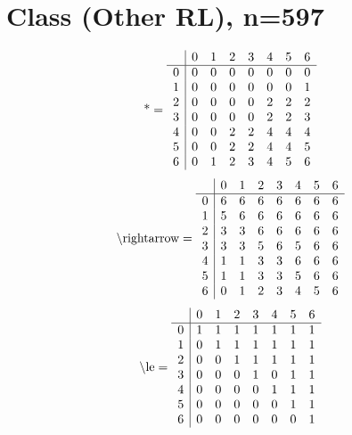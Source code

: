 \documentclass[11pt]{article}
\begin{document}
\section{Class (Other RL), n=597}
\[\text{*} = 
\begin{array}{r | r r r r r r r}
 & 0 & 1 & 2 & 3 & 4 & 5 & 6 \\ \hline
0 & 0 & 0 & 0 & 0 & 0 & 0 & 0 \\
1 & 0 & 0 & 0 & 0 & 0 & 0 & 1 \\
2 & 0 & 0 & 0 & 0 & 2 & 2 & 2 \\
3 & 0 & 0 & 0 & 0 & 2 & 2 & 3 \\
4 & 0 & 0 & 2 & 2 & 4 & 4 & 4 \\
5 & 0 & 0 & 2 & 2 & 4 & 4 & 5 \\
6 & 0 & 1 & 2 & 3 & 4 & 5 & 6 \\
\end{array}
\]
\[\text{\textbackslash rightarrow} = 
\begin{array}{r | r r r r r r r}
 & 0 & 1 & 2 & 3 & 4 & 5 & 6 \\ \hline
0 & 6 & 6 & 6 & 6 & 6 & 6 & 6 \\
1 & 5 & 6 & 6 & 6 & 6 & 6 & 6 \\
2 & 3 & 3 & 6 & 6 & 6 & 6 & 6 \\
3 & 3 & 3 & 5 & 6 & 5 & 6 & 6 \\
4 & 1 & 1 & 3 & 3 & 6 & 6 & 6 \\
5 & 1 & 1 & 3 & 3 & 5 & 6 & 6 \\
6 & 0 & 1 & 2 & 3 & 4 & 5 & 6 \\
\end{array}
\]
\[\text{\textbackslash le} = 
\begin{array}{r | r r r r r r r}
 & 0 & 1 & 2 & 3 & 4 & 5 & 6 \\ \hline
0 & 1 & 1 & 1 & 1 & 1 & 1 & 1 \\
1 & 0 & 1 & 1 & 1 & 1 & 1 & 1 \\
2 & 0 & 0 & 1 & 1 & 1 & 1 & 1 \\
3 & 0 & 0 & 0 & 1 & 0 & 1 & 1 \\
4 & 0 & 0 & 0 & 0 & 1 & 1 & 1 \\
5 & 0 & 0 & 0 & 0 & 0 & 1 & 1 \\
6 & 0 & 0 & 0 & 0 & 0 & 0 & 1 \\
\end{array}
\]
\end{document}
